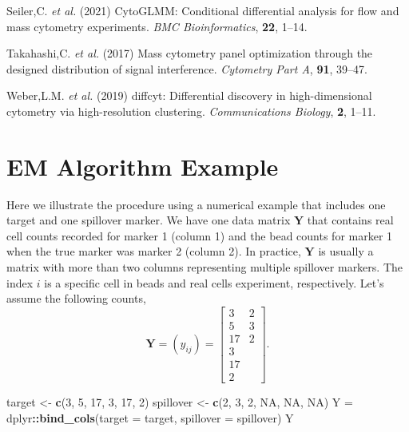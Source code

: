 \documentclass[
]{article}
\newenvironment{Shaded}{\begin{snugshade}}{\end{snugshade}}
\newcommand{\AttributeTok}[1]{\textcolor[rgb]{0.13,0.29,0.53}{#1}}
\newcommand{\ConstantTok}[1]{\textcolor[rgb]{0.56,0.35,0.01}{#1}}
\newcommand{\DecValTok}[1]{\textcolor[rgb]{0.00,0.00,0.81}{#1}}
\newcommand{\FunctionTok}[1]{\textcolor[rgb]{0.13,0.29,0.53}{\textbf{#1}}}
\newcommand{\NormalTok}[1]{#1}
\newcommand{\OtherTok}[1]{\textcolor[rgb]{0.56,0.35,0.01}{#1}}
\newcommand{\SpecialCharTok}[1]{\textcolor[rgb]{0.81,0.36,0.00}{\textbf{#1}}}
\newlength{\cslhangindent}
\newenvironment{CSLReferences}[2] %
 {\begin{list}{}{%
  \setlength{\itemindent}{0pt}
  \setlength{\leftmargin}{0pt}
  \setlength{\parsep}{0pt}
  \ifodd #1
   \setlength{\leftmargin}{\cslhangindent}
   \setlength{\itemindent}{-1\cslhangindent}
  \fi
  \setlength{\itemsep}{#2\baselineskip}}}
 {\end{list}}
\begin{document}
\begin{CSLReferences}{1}{0}
Seiler,C. \emph{et al.} (2021) CytoGLMM: Conditional differential analysis for flow and mass cytometry experiments. \emph{BMC Bioinformatics}, \textbf{22}, 1--14.

Takahashi,C. \emph{et al.} (2017) Mass cytometry panel optimization through the designed distribution of signal interference. \emph{Cytometry Part A}, \textbf{91}, 39--47.

Weber,L.M. \emph{et al.} (2019) {d}iffcyt: Differential discovery in high-dimensional cytometry via high-resolution clustering. \emph{Communications Biology}, \textbf{2}, 1--11.

\end{CSLReferences}

\newpage

\appendix


\section{EM Algorithm Example}\label{em-algorithm-example}

Here we illustrate the procedure using a numerical example that includes one target and one spillover marker. We have one data matrix \(\mathbf{Y}\) that contains real cell counts recorded for marker 1 (column 1) and the bead counts for marker 1 when the true marker was marker 2 (column 2). In practice, \(\mathbf{Y}\) is usually a matrix with more than two columns representing multiple spillover markers. The index \(i\) is a specific cell in beads and real cells experiment, respectively. Let's assume the following counts,
\[
\mathbf{Y} = (y_{ij}) = 
\begin{bmatrix}
3 & 2 \\ 
5 & 3 \\ 
17 & 2 \\ 
3   \\ 
17 \\ 
2 
\end{bmatrix}.
\]

\begin{Shaded}
\begin{Highlighting}[]
\NormalTok{target    }\OtherTok{\textless{}{-}} \FunctionTok{c}\NormalTok{(}\DecValTok{3}\NormalTok{, }\DecValTok{5}\NormalTok{, }\DecValTok{17}\NormalTok{,  }\DecValTok{3}\NormalTok{,  }\DecValTok{17}\NormalTok{, }\DecValTok{2}\NormalTok{)}
\NormalTok{spillover }\OtherTok{\textless{}{-}} \FunctionTok{c}\NormalTok{(}\DecValTok{2}\NormalTok{, }\DecValTok{3}\NormalTok{,  }\DecValTok{2}\NormalTok{, }\ConstantTok{NA}\NormalTok{, }\ConstantTok{NA}\NormalTok{, }\ConstantTok{NA}\NormalTok{)}
\NormalTok{Y }\OtherTok{=}\NormalTok{ dplyr}\SpecialCharTok{::}\FunctionTok{bind\_cols}\NormalTok{(}\AttributeTok{target =}\NormalTok{ target, }\AttributeTok{spillover =}\NormalTok{ spillover)}
\NormalTok{Y}
\end{Highlighting}
\end{Shaded}
\end{document}
